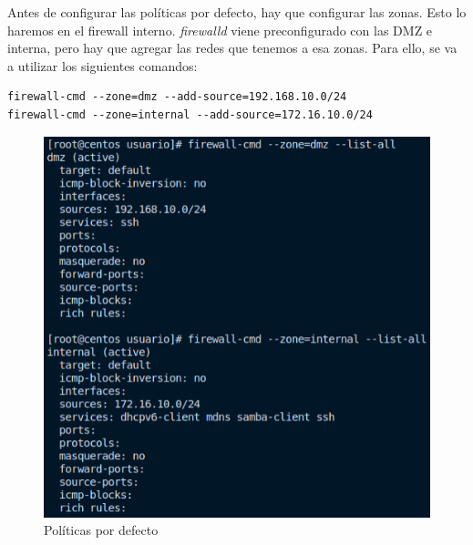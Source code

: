 \documentclass[11pt]{report}
\begin{document}
Antes de configurar las políticas por defecto, hay que configurar las zonas. Esto lo haremos en el firewall interno.
\emph{firewalld} viene preconfigurado con las DMZ e interna, pero hay que agregar las redes que tenemos a esa zonas. 
Para ello, se va a utilizar los siguientes comandos:
\begin{verbatim}
firewall-cmd --zone=dmz --add-source=192.168.10.0/24
firewall-cmd --zone=internal --add-source=172.16.10.0/24
\end{verbatim}
\begin{figure}[H]
  \centering
  \includegraphics[scale=0.65]{img/resultado_politicas_por_defecto.png}
  \caption{Políticas por defecto}
  \label{fig:politicas por defecto}
\end{figure}
\end{document}
